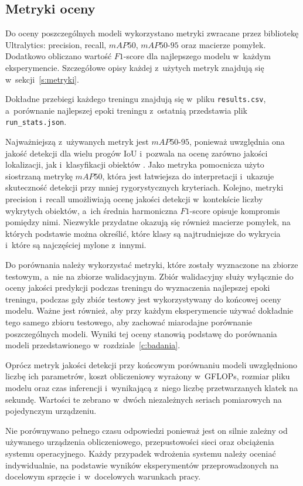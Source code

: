 \subsection{Metryki oceny}

Do oceny poszczególnych modeli wykorzystano metryki zwracane przez bibliotekę Ultralytics: precision, recall, $mAP50$, $mAP50\text{-}95$ oraz macierze pomyłek. Dodatkowo obliczano wartość $F1$-score dla najlepszego modelu w~każdym eksperymencie. Szczegółowe opisy każdej z~użytych metryk znajdują się w~sekcji~\ref{s:metryki}.

Dokładne przebiegi każdego treningu znajdują się w~pliku \texttt{results.csv}, a~porównanie najlepszej epoki treningu z~ostatnią przedstawia plik \texttt{run\_stats.json}.

Najważniejszą z~używanych metryk jest $mAP50\text{-}95$, ponieważ uwzględnia ona jakość detekcji dla wielu progów IoU i~pozwala na ocenę zarówno jakości lokalizacji, jak i~klasyfikacji obiektów \cite{bib:ultralytics_yolo_metrics}. Jako metryka pomocnicza użyto siostrzaną metrykę $mAP50$, która jest łatwiejsza do interpretacji i~ukazuje skuteczność detekcji przy mniej rygorystycznych kryteriach. Kolejno, metryki precision i~recall umożliwiają ocenę jakości detekcji w~kontekście liczby wykrytych obiektów, a~ich średnia harmoniczna $F1$-score opisuje kompromis pomiędzy nimi. Niezwykle przydatne okazują się również macierze pomyłek, na których podstawie można określić, które klasy są najtrudniejsze do wykrycia i~które są najczęściej mylone z~innymi.

Do porównania należy wykorzystać metryki, które zostały wyznaczone na zbiorze testowym, a~nie na zbiorze walidacyjnym. Zbiór walidacyjny służy wyłącznie do oceny jakości predykcji podczas treningu do wyznaczenia najlepszej epoki treningu, podczas gdy zbiór testowy jest wykorzystywany do końcowej oceny modelu. Ważne jest również, aby przy każdym eksperymencie używać dokładnie tego samego zbioru testowego, aby zachować miarodajne porównanie poszczególnych modeli. Wyniki tej oceny stanowią podstawę do porównania modeli przedstawionego w~rozdziale~\ref{c:badania}.

Oprócz metryk jakości detekcji przy końcowym porównaniu modeli uwzględniono liczbę ich parametrów, koszt obliczeniowy wyrażony w~GFLOPs, rozmiar pliku modelu oraz czas inferencji i~wynikającą z~niego liczbę przetwarzanych klatek na sekundę. Wartości te zebrano w~dwóch niezależnych seriach pomiarowych na pojedynczym urządzeniu.

Nie porównywano pełnego czasu odpowiedzi ponieważ jest on silnie zależny od używanego urządzenia obliczeniowego, przepustowości sieci oraz obciążenia systemu operacyjnego. Każdy przypadek wdrożenia systemu należy oceniać indywidualnie, na podstawie wyników eksperymentów przeprowadzonych na docelowym sprzęcie i~w~docelowych warunkach pracy.

